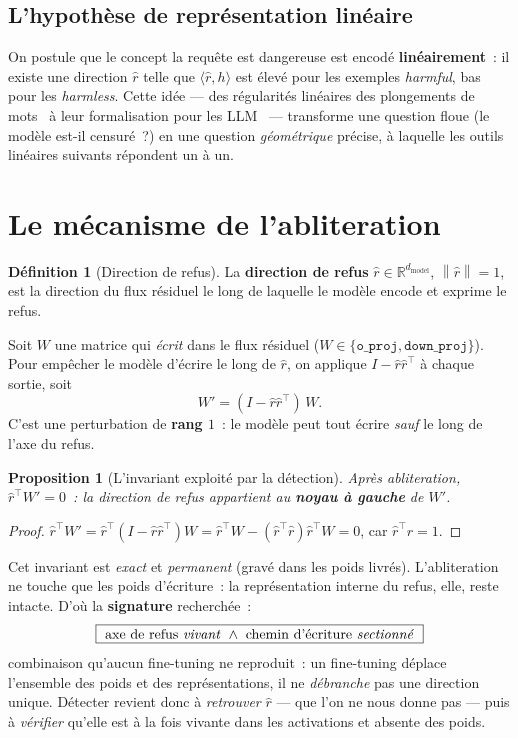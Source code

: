 \documentclass[11pt,a4paper]{article}
\theoremstyle{definition}
\newtheorem{definition}{Définition}
\theoremstyle{plain}
\newtheorem{proposition}{Proposition}
\newcommand{\R}{\mathbb{R}}
\newcommand{\rhat}{\hat{r}}
\newcommand{\norm}[1]{\left\lVert #1 \right\rVert}
\newcommand{\inner}[2]{\langle #1, #2 \rangle}
\newcommand{\dmodel}{d_{\text{model}}}
\begin{document}
\subsection{L'hypothèse de représentation linéaire}
On postule que le concept \og la requête est dangereuse\fg{} est encodé
\textbf{linéairement}~: il existe une direction $\rhat$ telle que $\inner{\rhat}{h}$
est élevé pour les exemples \emph{harmful}, bas pour les \emph{harmless}. Cette
idée — des régularités linéaires des plongements de mots~\cite{mikolov2013} à leur
formalisation pour les LLM~\cite{park2023} — transforme une question floue (\og le
modèle est-il censuré~?\fg{}) en une question \emph{géométrique} précise, à laquelle
les outils linéaires suivants répondent un à un.

\section{Le mécanisme de l'abliteration}\label{sec:meca}
\begin{definition}[Direction de refus]
La \textbf{direction de refus} $\rhat\in\R^{\dmodel}$, $\norm{\rhat}=1$, est la
direction du flux résiduel le long de laquelle le modèle encode et exprime le refus.
\end{definition}

Soit $W$ une matrice qui \emph{écrit} dans le flux résiduel
($W\in\{\texttt{o\_proj},\texttt{down\_proj}\}$). Pour empêcher le modèle d'écrire le
long de $\rhat$, on applique $I-\rhat\rhat^\top$ à chaque sortie, soit
\begin{equation}\label{eq:ablate}
  W' = (I-\rhat\rhat^\top)\,W .
\end{equation}
C'est une perturbation de \textbf{rang $1$}~: le modèle peut tout écrire \emph{sauf}
le long de l'axe du refus.

\begin{proposition}[L'invariant exploité par la détection]\label{prop:invariant}
Après abliteration, $\rhat^\top W'=0$~: la direction de refus appartient au
\textbf{noyau à gauche} de $W'$.
\end{proposition}
\begin{proof}
$\rhat^\top W'=\rhat^\top(I-\rhat\rhat^\top)W=\rhat^\top W-(\rhat^\top\rhat)\rhat^\top W=0$,
car $\rhat^\top\rhat=1$.
\end{proof}

\noindent Cet invariant est \emph{exact} et \emph{permanent} (gravé dans les poids
livrés). L'abliteration ne touche que les poids d'écriture~: la représentation
interne du refus, elle, reste intacte. D'où la \textbf{signature} recherchée~:
\[
  \boxed{\ \text{axe de refus \emph{vivant}}\ \wedge\ \text{chemin d'écriture \emph{sectionné}}\ }
\]
combinaison qu'aucun fine-tuning ne reproduit~: un fine-tuning déplace l'ensemble des
poids et des représentations, il ne \emph{débranche} pas une direction unique.
Détecter revient donc à \emph{retrouver} $\rhat$ — que l'on ne nous donne pas — puis à
\emph{vérifier} qu'elle est à la fois vivante dans les activations et absente des
poids.
\end{document}
